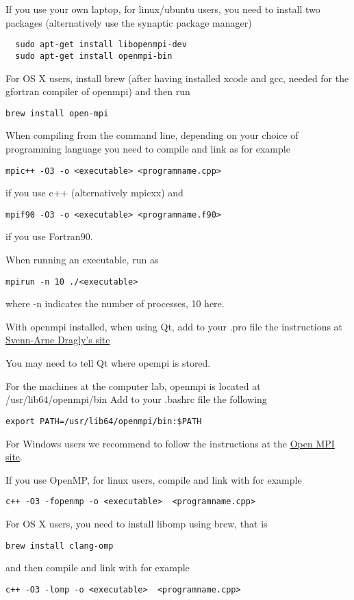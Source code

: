 \documentclass[%
oneside,                 %
final,                   %
10pt]{article}
\begin{document}
If you use your own laptop, for linux/ubuntu users, you need to install two packages (alternatively use the synaptic package manager)
\begin{verbatim}
  sudo apt-get install libopenmpi-dev
  sudo apt-get install openmpi-bin
\end{verbatim}
For OS X users, install brew (after having installed xcode and gcc, needed for the 
gfortran compiler of openmpi) and then run
\begin{verbatim}
brew install open-mpi
\end{verbatim}
When compiling from the command line, depending on your choice of programming language you need to compile and link as for example
\begin{verbatim}
mpic++ -O3 -o <executable> <programname.cpp>
\end{verbatim}
if you use c++ (alternatively mpicxx) and
\begin{verbatim}
mpif90 -O3 -o <executable> <programname.f90>
\end{verbatim}
if you use Fortran90.

When running an executable, run as
\begin{verbatim}
mpirun -n 10 ./<executable>
\end{verbatim}
where -n indicates the number of processes, 10 here.

With openmpi installed, when using Qt, add to your .pro file the instructions at \href{{http://dragly.org/2012/03/14/developing-mpi-applications-in-qt-creator/}}{Svenn-Arne Dragly's site}

You may need to tell Qt where opempi is stored.

For the machines at the computer lab, openmpi is located  at /usr/lib64/openmpi/bin
Add to your .bashrc file the following
\begin{verbatim}
export PATH=/usr/lib64/openmpi/bin:$PATH 
\end{verbatim}
For Windows users we recommend to follow the instructions at the \href{{https://www.open-mpi.org/software/ompi/v1.6/ms-windows.php}}{Open MPI site}.

If you use OpenMP, for linux users, compile and link with for example
\begin{verbatim}
c++ -O3 -fopenmp -o <executable>  <programname.cpp>
\end{verbatim}
For OS X users, you need to install libomp using brew, that is
\begin{verbatim}
brew install clang-omp
\end{verbatim}
and then compile and link with for example
\begin{verbatim}
c++ -O3 -lomp -o <executable>  <programname.cpp>
\end{verbatim}
\end{document}
